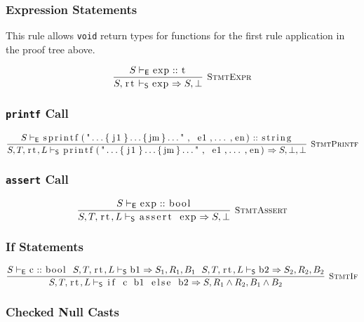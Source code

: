 \documentclass{article}
\newcommand{\code}[1]{\lstinline[columns=fixed]{#1}}
\newcommand{\drmrule}[5]{\frac{#1}{#2\vdash_{\mathsf{#3}}#4}\textsc{\ \small{#5}}}
\newcommand{\ruleapp}[1]{\vdash_{\mathsf{#1}}}
\newcommand{\mc}[1]{\textnormal{\code{#1}}}
\begin{document}
			\subsubsection{Expression Statements}
			
				This rule allows \code{void} return types for functions for the first rule application in the proof tree above.
			
				\begin{align*}
					\drmrule{S\ruleapp{E}\mc{exp} :: \mc{t}}{S,\mc{rt}}{S}{\mc{exp} \Rightarrow S,\bot}{StmtExpr}
				\end{align*}
				
			\subsubsection{\code{printf} Call}
			
				\begin{align*}
					\drmrule{S\ruleapp{E}\mc{sprintf("...\{j1\}...\{jm\}...", e1,...,en)}::\mc{string}}{S,T,\mc{rt},L}{S}{\mc{printf("...\{j1\}...\{jm\}...", e1,...,en)} \Rightarrow S,\bot,\bot}{StmtPrintf}
				\end{align*}
				
			\subsubsection{\code{assert} Call}
			
				\begin{align*}
					\drmrule{S\ruleapp{E}\mc{exp}::\mc{bool}}{S,T,\mc{rt},L}{S}{\mc{assert exp}\Rightarrow S,\bot}{StmtAssert}
				\end{align*}
			
			\subsubsection{If Statements}
			
				\begin{align*}
					\drmrule{S\ruleapp{E}\mc{c} :: \mc{bool}\ \ S,T,\mc{rt},L\ruleapp{S}\mc{b1}\Rightarrow S_1,R_1,B_1\ \ S,T,\mc{rt},L\ruleapp{S}\mc{b2}\Rightarrow S_2,R_2,B_2}{S,T,\mc{rt},L}{S}{\mc{if c b1 else b2} \Rightarrow S,R_1\wedge R_2,B_1\wedge B_2}{StmtIf}
				\end{align*}
				
			\subsubsection{Checked Null Casts}
			
\end{document}
